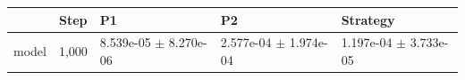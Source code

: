 \begin{tabular}{lllll}
\toprule
 & Step & P1 & P2 & Strategy \\
\midrule
model & 1,000 & 8.539e-05 $\pm$ 8.270e-06 & 2.577e-04 $\pm$ 1.974e-04 & 1.197e-04 $\pm$ 3.733e-05 \\
\bottomrule
\end{tabular}
